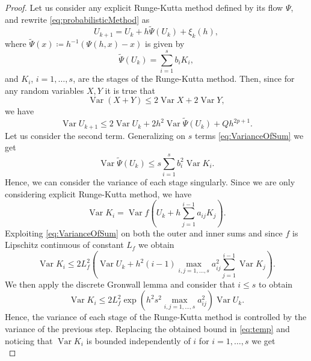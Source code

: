 \documentclass{siamart1116}
\numberwithin{theorem}{section}
\newcommand{\defeq}{\coloneqq}
\newcommand{\Var}{\operatorname{Var}}
\newcommand{\sksum}{\textstyle\sum}
\begin{document}
\begin{proof}  Let us consider any explicit Runge-Kutta method defined by its flow $\Psi$, and rewrite \eqref{eq:probabilisticMethod} as
	\begin{equation}
		U_{k+1} = U_k + h\tilde \Psi (U_k) + \xi_k(h),
	\end{equation}
	where $\tilde\Psi(x) \defeq h^{-1}(\Psi(h, x) - x)$ is given by
	\begin{equation}
		\tilde\Psi(U_k) = \sksum_{i = 1}^{s} b_i K_i,
	\end{equation} 
	and $K_i$, $i = 1, \ldots, s$, are the stages of the Runge-Kutta method. Then, since for any random variables $X, Y$ it is true that
	\begin{equation}\label{eq:VarianceOfSum}
		\Var (X + Y) \leq 2 \Var X + 2 \Var Y,
	\end{equation}
	we have
	\begin{equation}\label{eq:VarUkPlusOne}
		\Var U_{k+1} \leq 2\Var U_k + 2h^2 \Var \tilde \Psi (U_k) + Q h^{2p + 1}.
	\end{equation}
	Let us consider the second term. Generalizing on $s$ terms \eqref{eq:VarianceOfSum} we get
	\begin{equation}\label{eq:temp}
		\Var \tilde \Psi (U_k) \leq s\sksum_{i = 1}^{s} b_i^2 \Var K_i.
	\end{equation}
	Hence, we can consider the variance of each stage singularly. Since we are only considering explicit Runge-Kutta method, we have
	\begin{equation}
		\Var K_i = \Var f(U_k + h\sksum_{j=1}^{i-1}a_{ij}K_j).
	\end{equation}
	Exploiting \eqref{eq:VarianceOfSum} on both the outer and inner sums and since $f$ is Lipschitz continuous of constant $L_f$ we obtain
	\begin{equation}
		\Var K_i \leq 2L_f^2 (\Var U_k + h^2(i-1) \max_{i,j=1,\ldots,s}a_{ij}^2 \sksum_{j=1}^{i-1} \Var K_j).
	\end{equation}
	We then apply the discrete Gronwall lemma and consider that $i \leq s$ to obtain
	\begin{equation}
		\Var K_i \leq 2L_f^2\exp(h^2s^2 \max_{i,j=1,\ldots,s}a_{ij}^2)\Var U_k.
	\end{equation}
	Hence, the variance of each stage of the Runge-Kutta method is controlled by the variance of the previous step. Replacing the obtained bound in \eqref{eq:temp} and noticing that $\Var K_i$ is bounded independently of $i$ for $i = 1, \ldots, s$ we get 
	\begin{equation}\label{eq:VarTildePsi}

\end{equation}
\end{proof}
\end{document}
